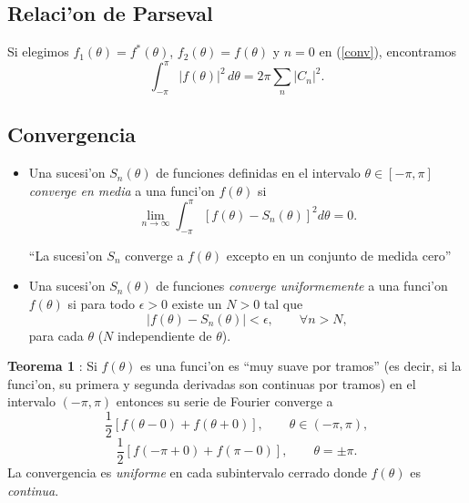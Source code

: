 \subsection{Relaci'on de Parseval}
Si elegimos $f_1(\theta)=f^\ast (\theta)$, $f_2(\theta)=f(\theta)$ y $n=0$ en (\ref{conv}), encontramos
\begin{equation}
\boxed{\int_{-\pi}^\pi |f(\theta)|^2\,d\theta 
=  2\pi\sum_n\left|C_n\right|^2.}
 \end{equation}

\subsection{Convergencia}

\begin{itemize}
\item Una sucesi'on $S_n(\theta)$ de funciones definidas en el intervalo $\theta\in[-\pi,\pi]$ \textit{converge en media} a una funci'on $f(\theta)$ si
\begin{equation}
\lim_{n\to\infty}\int_{-\pi}^{\pi}\left[f(\theta)-S_n(\theta)\right]^2d\theta=0.
\end{equation}

``La sucesi'on $S_n$ converge a $f(\theta)$ excepto en un conjunto de medida cero''
\item Una sucesi'on $S_n(\theta)$ de funciones \textit{converge uniformemente} a una funci'on $f(\theta)$ si para todo $\epsilon>0$ existe un $N>0$ tal que
\begin{equation}
\left|f(\theta)-S_n(\theta)\right|<\epsilon, \qquad \forall n>N,
\end{equation}
para cada $\theta$ ($N$ independiente de $\theta$).
\end{itemize}

\textbf{Teorema 1} \cite{Butkov}: Si $f(\theta)$ es una funci'on es ``muy suave por tramos'' (es decir, si la funci'on, su primera y segunda derivadas son continuas por tramos) en el intervalo $(-\pi,\pi)$ entonces su serie de Fourier converge a
\begin{equation}
\frac{1}{2}\left[f(\theta-0)+f(\theta+0)\right], \qquad \theta\in (-\pi,\pi),
\end{equation}
\begin{equation}
\frac{1}{2}\left[f(-\pi+0)+f(\pi-0)\right], \qquad \theta=\pm\pi .
\end{equation}
La convergencia es \textit{uniforme} en cada subintervalo cerrado donde $f(\theta)$ es \textit{continua}.


